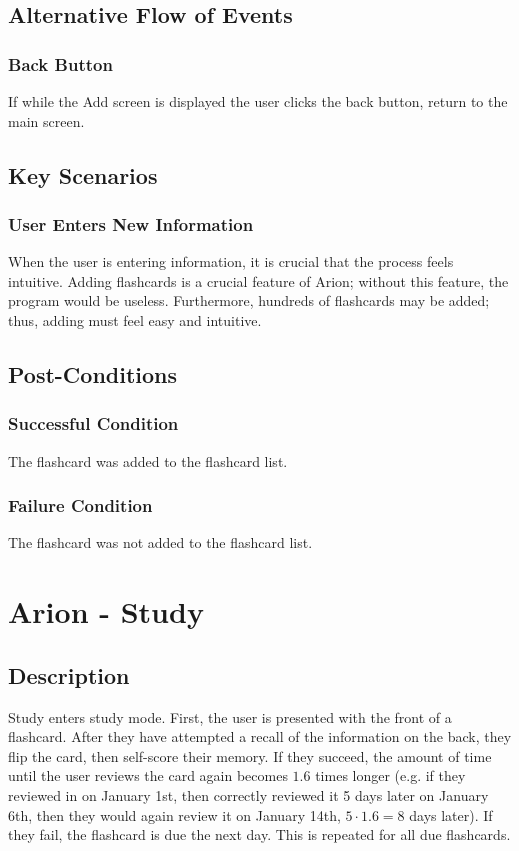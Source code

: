 \documentclass{scrreprt}
\begin{document}
\section{Alternative Flow of Events}

    \subsection{Back Button}
    If while the Add screen is displayed the user clicks the back button,
    return to the main screen.

\section{Key Scenarios}
    \subsection{User Enters New Information}
    When the user is entering information, it is crucial that the process feels intuitive.
    Adding flashcards is a crucial feature of Arion; without this feature, the program would be useless.
    Furthermore, hundreds of flashcards may be added; thus, adding must feel easy and intuitive.

\section{Post-Conditions}
    \subsection{Successful Condition}
    The flashcard was added to the flashcard list.
    
    \subsection{Failure Condition}
    The flashcard was not added to the flashcard list.

\chapter{Arion - Study}

\section{Description}

Study enters study mode. First, the user is presented with the front of a flashcard.
After they have attempted a recall of the information on the back, they flip the card,
then self-score their memory. If they succeed, the amount of time until the user reviews the card
again becomes $1.6$ times longer (e.g. if they reviewed in on January 1st, then correctly reviewed
it 5 days later on January 6th, then they would again review it on January 14th, $5\cdot 1.6=8$ days later).
If they fail, the flashcard is due the next day. This is repeated for all due flashcards.
\end{document}
